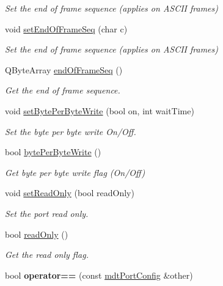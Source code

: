 \begin{DoxyCompactItemize}
\begin{DoxyCompactList}\small\item\em Set the end of frame sequence (applies on ASCII frames) \end{DoxyCompactList}\item 
void \hyperlink{classmdt_port_config_a9c67e95bb660a13313ec03e07a924793}{setEndOfFrameSeq} (char c)
\begin{DoxyCompactList}\small\item\em Set the end of frame sequence (applies on ASCII frames) \end{DoxyCompactList}\item 
QByteArray \hyperlink{classmdt_port_config_a42f87381e6d6892770917e4ca6c80072}{endOfFrameSeq} ()
\begin{DoxyCompactList}\small\item\em Get the end of frame sequence. \end{DoxyCompactList}\item 
void \hyperlink{classmdt_port_config_ac6cb3d8fbefad9a832335c3f2023832c}{setBytePerByteWrite} (bool on, int waitTime)
\begin{DoxyCompactList}\small\item\em Set the byte per byte write On/Off. \end{DoxyCompactList}\item 
bool \hyperlink{classmdt_port_config_a687dfdffd913cd68141a784f3f77bc7e}{bytePerByteWrite} ()
\begin{DoxyCompactList}\small\item\em Get byte per byte write flag (On/Off) \end{DoxyCompactList}\item 
\hypertarget{classmdt_port_config_ad6b62292f640b99bb337f7e0de44000d}{
void \hyperlink{classmdt_port_config_ad6b62292f640b99bb337f7e0de44000d}{setReadOnly} (bool readOnly)}
\label{classmdt_port_config_ad6b62292f640b99bb337f7e0de44000d}

\begin{DoxyCompactList}\small\item\em Set the port read only. \end{DoxyCompactList}\item 
\hypertarget{classmdt_port_config_adc59fad1589fa527c9ebb9fac483777c}{
bool \hyperlink{classmdt_port_config_adc59fad1589fa527c9ebb9fac483777c}{readOnly} ()}
\label{classmdt_port_config_adc59fad1589fa527c9ebb9fac483777c}

\begin{DoxyCompactList}\small\item\em Get the read only flag. \end{DoxyCompactList}\item 
\hypertarget{classmdt_port_config_a639c71f90cfeb7e2160ad90e9775054b}{
bool {\bfseries operator==} (const \hyperlink{classmdt_port_config}{mdtPortConfig} \&other)}
\label{classmdt_port_config_a639c71f90cfeb7e2160ad90e9775054b}


\end{DoxyCompactItemize}
